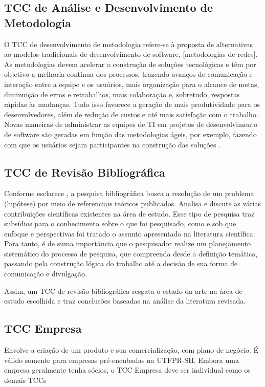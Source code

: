 \subsection{TCC de Análise e Desenvolvimento de Metodologia}\label{sec:AnaliseDese}
O TCC de desenvolvimento de metodologia refere-se à proposta de alternativas ao modelos tradicionais de desenvolvimento de software, [metodologias de redes]. As metodologias devem acelerar a construção de soluções tecnológicas e têm por objetivo a melhoria contínua dos processos, trazendo avanços de comunicação e interação entre a equipe e os usuários, mais organização para o alcance de metas, diminuição de erros e retrabalhos, mais colaboração e, sobretudo, respostas rápidas às mudanças. Tudo isso favorece a geração de mais produtividade para os desenvolvedores, além de redução de custos e até mais satisfação com o trabalho. Novas maneiras de administrar as equipes de TI em projetos de desenvolvimento de software são geradas em função das metodologias ágeis, por exemplo, fazendo com que os usuários sejam participantes na construção das soluções \cite{Sommerville2011}. 

\subsection{TCC de Revisão Bibliográfica}\label{sec:RevisaoBib}
Conforme esclarece \cite{Boccato2006},  a pesquisa bibliográfica busca a resolução de um problema (hipótese) por meio de referenciais teóricos publicados. Analisa e discute as várias contribuições científicas existentes na área de estudo. Esse tipo de pesquisa traz subsídios para o conhecimento sobre o que foi pesquisado, como e sob que enfoque e perspectivas foi tratado o assunto apresentado na literatura científica. Para tanto, é de suma importância que o pesquisador realize um planejamento sistemático do processo de pesquisa, que compreenda desde a definição temática, passando pela construção lógica do trabalho até a decisão de sua forma de comunicação e divulgação.

Assim, um TCC de revisão bibliográfica resgata o estado da arte na área de estudo escolhida e traz conclusões baseadas na análise da literatura revisada.

\subsection{TCC Empresa}\label{sec:Empresa}
Envolve a criação de um produto e sua comercialização, com plano de negócio. É válido somente para empresas pré-encubadas na UTFPR-SH. Embora uma empresa geralmente tenha sócios, o TCC Empresa deve ser individual como os demais TCCs

